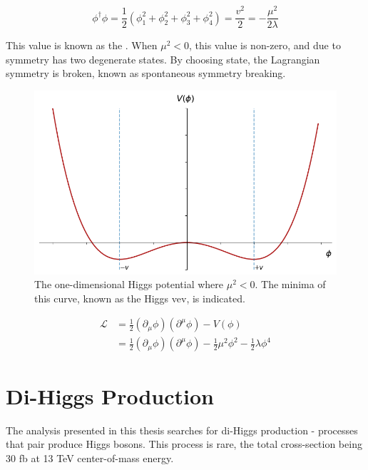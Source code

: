 \begin{equation}
    \phi^\dagger \phi = \frac{1}{2}(\phi_{1}^{2}+\phi_{2}^{2}+\phi_{3}^{2}+\phi_{4}^{2}) = \frac{v^2}{2} = -\frac{\mu^2}{2\lambda}
\end{equation}

This value is known as the . When $\mu^2 < 0$, this value is non-zero, and due to symmetry has two degenerate states. By choosing state, the Lagrangian symmetry is broken, known as spontaneous symmetry breaking.

\begin{figure}[!ht]
    \centering
    \includegraphics[width=\textwidth]{chapters/chapter1_theory/images/higgs-2d-vev.png}
    \caption{The one-dimensional Higgs potential where $\mu^2 <0$. The minima of this curve, known as the Higgs \gls{vev}, is indicated.}
    \label{fig:higgs-potential}
\end{figure}


\begin{equation} \label{higgs-lagrangian}
    \begin{aligned}
        \mathcal{L} &= \frac{1}{2}(\partial_{\mu}\phi)(\partial^{\mu}\phi) - V(\phi)\\
        &= \frac{1}{2}(\partial_{\mu}\phi)(\partial^{\mu}\phi) - \frac{1}{2}\mu^2\phi^2 - \frac{1}{2}\lambda\phi^4
    \end{aligned}
\end{equation}



\section{Di-Higgs Production}
The analysis presented in this thesis searches for di-Higgs production - processes that pair produce Higgs bosons. This process is rare, the total cross-section being {\color{red} 30} fb at 13 TeV center-of-mass energy.

